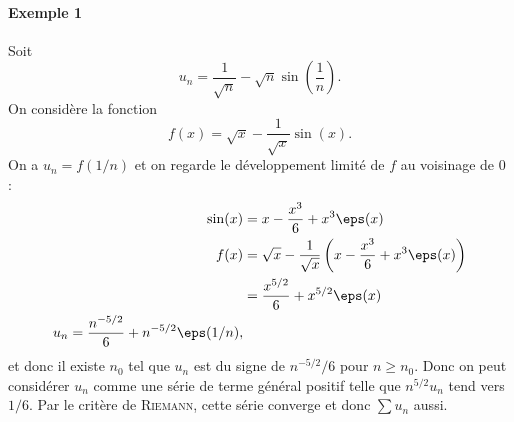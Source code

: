 \documentclass{livre}
\begin{document}
\paragraph{Exemple 1}Soit \[ u_n = \frac{1}{\sqrt{n}} - \sqrt{n}\sin\left(\frac{1}{n}\right).\]
On considère la fonction \[f(x) = \sqrt{x} - \frac{1}{\sqrt{x}}\sin(x). \]On a $u_n = f(1/n)$ et on regarde le développement limité de $f$ au voisinage de $0$ : 
\begin{align*}
\sin(x) &= x - \frac{x^{3}}{6} + x^{3}\eps(x) \\
f(x) &= \sqrt{x} - \frac{1}{\sqrt{x}}\left(x-\frac{x^{3}}{6} + x^{3}\eps(x)\right)\\
&= \frac{x^{5/2}}{6} + x^{5/2}\eps(x) \\
u_n = \frac{n^{-5/2}}{6} + n^{-5/2}\eps(1/n),
\end{align*}
et donc il existe $n_0$ tel que $u_n$ est du signe de $n^{-5/2}/6$ pour $n\geq n_0$. Donc on peut considérer $u_n$ comme une série de terme général positif telle que $n^{5/2}u_n$ tend vers $1/6$. Par le critère de \textsc{Riemann}, cette série converge et donc $\sum u_n$ aussi.
\end{document}
